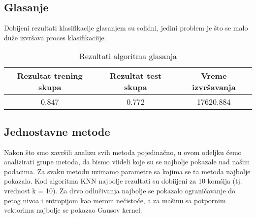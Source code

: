 \documentclass[a4paper]{article}
\begin{document}
\subsection{Glasanje}
Dobijeni rezultati klasifikacije glasanjem su solidni, jedini problem je što se malo duže izvršava proces klasifikaciije.

\begin{table}[h]
\centering
\begin{tabular}{|c|c|c|}
\hline
Rezultat trening skupa & Rezultat test skupa & Vreme izvršavanja \\ \hline
0.847                  & 0.772               & 17620.884         \\ \hline
\end{tabular}
\caption{Rezultati algoritma glasanja}
\end{table}

\pagebreak

\subsection{Jednostavne metode}
Nakon što smo završili analizu svih metoda pojedinačno, u ovom odeljku
ćemo analizirati grupe metoda, da bismo viideli koje su se najbolje pokazale nad našim podacima. Za svaku metodu uzimamo parametre sa kojima
se ta metoda najbolje pokazala. Kod algoritma KNN najbolje rezultati su dobiijeni za 10 komšija (tj. vrednost k = 10). Za drvo odlučivanja
najbolje se pokazalo ograničavanje do petog nivoa i entropijom kao merom nečistoće, a za mašinu sa potpornim vektorima najbolje se pokazao
Gausov kernel.
\end{document}
